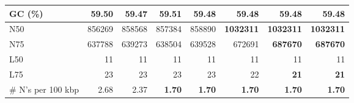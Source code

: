 \documentclass[12pt,a4paper]{article}
\begin{document}
\begin{table}[ht]
\begin{center}
\begin{tabular}{|l*{7}{|r}|}
GC (\%) & 59.50 & 59.47 & 59.51 & 59.48 & 59.48 & 59.48 & 59.48 \\ \hline
N50 & 856269 & 858568 & 857384 & 858890 & {\bf 1032311} & {\bf 1032311} & {\bf 1032311} \\ \hline
N75 & 637788 & 639273 & 638504 & 639528 & 672691 & {\bf 687670} & {\bf 687670} \\ \hline
L50 & 11 & 11 & 11 & 11 & 11 & 11 & 11 \\ \hline
L75 & 23 & 23 & 23 & 23 & 22 & {\bf 21} & {\bf 21} \\ \hline
\# N's per 100 kbp & 2.68 & 2.37 & {\bf 1.70} & {\bf 1.70} & {\bf 1.70} & {\bf 1.70} & {\bf 1.70} \\ \hline
\end{tabular}
\end{center}
\end{table}
\end{document}
